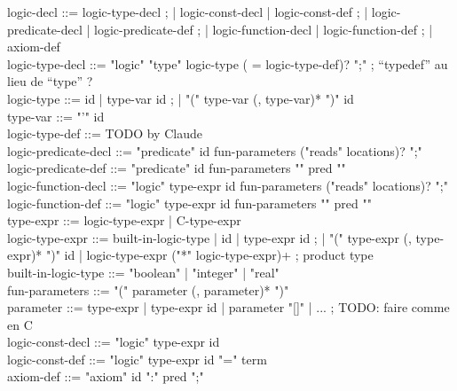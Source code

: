 \begin{syntax}
  logic-decl ::= logic-type-decl ;
          | logic-const-decl | logic-const-def ;
          | logic-predicate-decl | logic-predicate-def ;
          | logic-function-decl | logic-function-def ;
          | axiom-def
  \\
  logic-type-decl ::= "logic" "type" logic-type ( = logic-type-def)? ";" ; ``typedef'' au lieu de ``type'' ?
  \\
  logic-type ::= id | type-var id ;
                 | "(" type-var (, type-var)* ")" id
                 \\
  type-var ::= "'" id
  \\
  logic-type-def ::= TODO by Claude
  \\
  logic-predicate-decl ::= "predicate" id fun-parameters ("reads" locations)? ";"
  \\
  logic-predicate-def ::= "predicate" id fun-parameters "{" pred "}"
  \\
  logic-function-decl ::= "logic" type-expr id fun-parameters ("reads" locations)? ";"
  \\
  logic-function-def ::= "logic" type-expr id fun-parameters "{" pred "}"
  \\
  type-expr ::= logic-type-expr | C-type-expr
  \\
  logic-type-expr ::= built-in-logic-type | id | type-expr id ;
                 | "(" type-expr (, type-expr)* ")" id
                 | logic-type-expr ("*" logic-type-expr)+  ; product type
  \\
  built-in-logic-type ::= "boolean" | "integer" | "real"
  \\
  fun-parameters ::= "(" parameter (, parameter)* ")"
  \\
  parameter ::= type-expr | type-expr id | parameter "[]" | ... ; TODO: faire comme en C
  \\
  logic-const-decl ::= "logic" type-expr id
  \\
  logic-const-def ::= "logic" type-expr id "=" term
  \\
axiom-def ::= "axiom" id ":" pred ";"
\end{syntax}